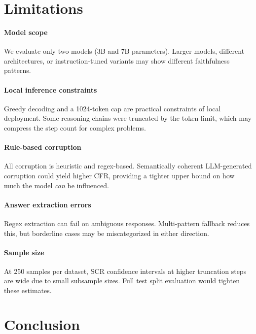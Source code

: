 \documentclass[11pt,twocolumn]{article}
\begin{document}
\section{Limitations}

\paragraph{Model scope}
We evaluate only two models (3B and 7B parameters). Larger models, different
architectures, or instruction-tuned variants may show different faithfulness
patterns.

\paragraph{Local inference constraints}
Greedy decoding and a 1024-token cap are practical constraints of local
deployment. Some reasoning chains were truncated by the token limit, which
may compress the step count for complex problems.

\paragraph{Rule-based corruption}
All corruption is heuristic and regex-based. Semantically coherent
LLM-generated corruption could yield higher CFR, providing a tighter
upper bound on how much the model \emph{can} be influenced.

\paragraph{Answer extraction errors}
Regex extraction can fail on ambiguous responses. Multi-pattern fallback
reduces this, but borderline cases may be miscategorized in either direction.

\paragraph{Sample size}
At 250 samples per dataset, SCR confidence intervals at higher truncation
steps are wide due to small subsample sizes. Full test split evaluation would
tighten these estimates.


\section{Conclusion}
\end{document}
